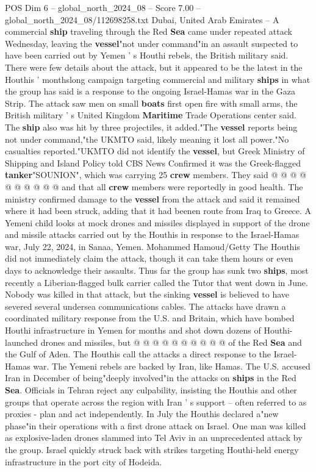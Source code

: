 \begin{textsample}{POS Dim 6 – global\_north\_2024\_08 – Score 7.00 – global\_north\_2024\_08/112698258.txt}  \label{ex:f6_pos_295}
Dubai, United Arab Emirates -- A commercial \textbf{ship} traveling through the Red \textbf{Sea} came under repeated attack Wednesday, leaving the \textbf{vessel}"not under command"in an assault suspected to have been carried out by Yemen ' s Houthi rebels, the British military said.
There were few details about the attack, but it appeared to be the latest in the Houthis ' monthslong campaign targeting commercial and military \textbf{ships} in what the group has said is a response to the ongoing Israel-Hamas war in the Gaza Strip.
The attack saw men on small \textbf{boats} first open fire with small arms, the British military ' s United Kingdom \textbf{Maritime} Trade Operations center said.
The \textbf{ship} also was hit by three projectiles, it added."The \textbf{vessel} reports being not under command,"the UKMTO said, likely meaning it lost all power."No casualties reported."UKMTO did not identify the \textbf{vessel}, but Greek Ministry of Shipping and Island Policy told CBS News Confirmed it was the Greek-flagged \textbf{tanker}"SOUNION", which was carrying 25 \textbf{crew} members.
They said @ @ @ @ @ @ @ @ @ @ and that all \textbf{crew} members were reportedly in good health.
The ministry confirmed damage to the \textbf{vessel} from the attack and said it remained where it had been struck, adding that it had beenen route from Iraq to Greece.
A Yemeni child looks at mock drones and missiles displayed in support of the drone and missile attacks carried out by the Houthis in response to the Israel-Hamas war, July 22, 2024, in Sanaa, Yemen.
Mohammed Hamoud/Getty The Houthis did not immediately claim the attack, though it can take them hours or even days to acknowledge their assaults.
Thus far the group has sunk two \textbf{ships}, most recently a Liberian-flagged bulk carrier called the Tutor that went down in June.
Nobody was killed in that attack, but the sinking \textbf{vessel} is believed to have severed several undersea communications cables.
The attacks have drawn a coordinated military response from the U.S. and Britain, which have bombed Houthi infrastructure in Yemen for months and shot down dozens of Houthi-launched drones and missiles, but @ @ @ @ @ @ @ @ @ @ of the Red \textbf{Sea} and the Gulf of Aden.
The Houthis call the attacks a direct response to the Israel-Hamas war.
The Yemeni rebels are backed by Iran, like Hamas.
The U.S. accused Iran in December of being"deeply involved"in the attacks on \textbf{ships} in the Red \textbf{Sea}.
Officials in Tehran reject any culpability, insisting the Houthis and other groups that operate across the region with Iran ' s support -- often referred to as proxies - plan and act independently.
In July the Houthis declared a"new phase"in their operations with a first drone attack on Israel.
One man was killed as explosive-laden drones slammed into Tel Aviv in an unprecedented attack by the group.
Israel quickly struck back with strikes targeting Houthi-held energy infrastructure in the port city of Hodeida.

\end{textsample}
